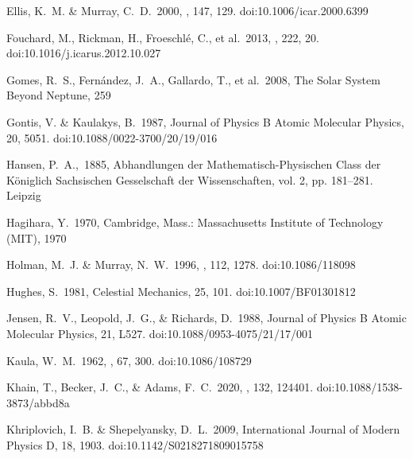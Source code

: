 \documentclass[twocolumn]{aastex62}
\begin{document}
\begin{thebibliography}{00}

 Ellis, K.~M. \& Murray, C.~D.\ 2000, \icarus, 147, 129. doi:10.1006/icar.2000.6399



 Fouchard, M., Rickman, H., Froeschl{\'e}, C., et al.\ 2013, \icarus, 222, 20. doi:10.1016/j.icarus.2012.10.027


 Gomes, R.~S., Fern{\'a}ndez, J.~A., Gallardo, T., et al.\ 2008, The Solar System Beyond Neptune, 259

 Gontis, V. \& Kaulakys, B.\ 1987, Journal of Physics B Atomic Molecular Physics, 20, 5051. doi:10.1088/0022-3700/20/19/016



 Hansen, P.~A.,\ 1885, Abhandlungen der Mathematisch-Physischen Class der Königlich Sachsischen Gesselschaft der Wissenschaften, vol. 2, pp. 181–281. Leipzig

 Hagihara, Y.\ 1970, Cambridge, Mass.: Massachusetts Institute of Technology (MIT), 1970

 Holman, M.~J. \& Murray, N.~W.\ 1996, \aj, 112, 1278. doi:10.1086/118098

 Hughes, S.\ 1981, Celestial Mechanics, 25, 101. doi:10.1007/BF01301812




 Jensen, R.~V., Leopold, J.~G., \& Richards, D.\ 1988, Journal of Physics B Atomic Molecular Physics, 21, L527. doi:10.1088/0953-4075/21/17/001



 Kaula, W.~M.\ 1962, \aj, 67, 300. doi:10.1086/108729

 Khain, T., Becker, J.~C., \& Adams, F.~C.\ 2020, \pasp, 132, 124401. doi:10.1088/1538-3873/abbd8a

 Khriplovich, I.~B. \& Shepelyansky, D.~L.\ 2009, International Journal of Modern Physics D, 18, 1903. doi:10.1142/S0218271809015758


\end{thebibliography}
\end{document}
